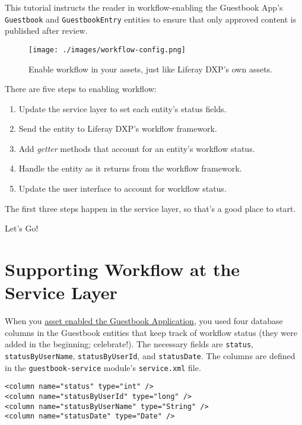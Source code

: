 \noindent\hrulefill

This tutorial instructs the reader in workflow-enabling the Guestbook
App's \texttt{Guestbook} and \texttt{GuestbookEntry} entities to ensure
that only approved content is published after review.

\begin{figure}
\centering
\texttt{[image: ./images/workflow-config.png]}
\caption{Enable workflow in your assets, just like Liferay DXP's own
assets.}
\end{figure}

There are five steps to enabling workflow:

\begin{enumerate}
\def\labelenumi{\arabic{enumi}.}
\item
  Update the service layer to set each entity's status fields.
\item
  Send the entity to Liferay DXP's workflow framework.
\item
  Add \emph{getter} methods that account for an entity's workflow
  status.
\item
  Handle the entity as it returns from the workflow framework.
\item
  Update the user interface to account for workflow status.
\end{enumerate}

The first three steps happen in the service layer, so that's a good
place to start.

Let's Go!{}

\chapter{Supporting Workflow at the Service
Layer}\label{supporting-workflow-at-the-service-layer}

When you
\href{/docs/7-2/tutorials/-/knowledge_base/t/assets-integrating-with-liferays-framework}{asset
enabled the Guestbook Application}, you used four database columns in
the Guestbook entities that keep track of workflow status (they were
added in the beginning; celebrate!). The necessary fields are
\texttt{status}, \texttt{statusByUserName}, \texttt{statusByUserId}, and
\texttt{statusDate}. The columns are defined in the
\texttt{guestbook-service} module's \texttt{service.xml} file.

\begin{verbatim}
<column name="status" type="int" />
<column name="statusByUserId" type="long" />
<column name="statusByUserName" type="String" />
<column name="statusDate" type="Date" />
\end{verbatim}


